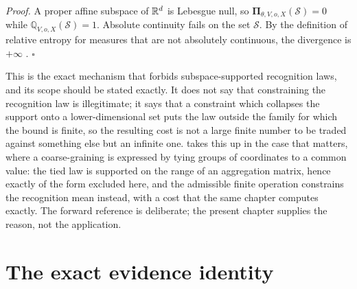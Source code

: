 \emph{Proof.} A proper affine subspace of \(\mathbb R^{d}\) is Lebesgue null, so \(\boldsymbol\Pi_{\theta,V,o,X}(\mathcal S)=0\) while \(\mathbb Q_{V,o,X}(\mathcal S)=1\). Absolute continuity fails on the set \(\mathcal S\). By the definition of relative entropy for measures that are not absolutely continuous, the divergence is \(+\infty\) \citep{Kullback1951,Csiszar1967}. \hfill\(\square\)

This is the exact mechanism that forbids subspace-supported recognition laws, and its scope should be stated exactly. It does not say that constraining the recognition law is illegitimate; it says that a constraint which collapses the support onto a lower-dimensional set puts the law outside the family for which the bound is finite, so the resulting cost is not a large finite number to be traded against something else but an infinite one.  takes this up in the case that matters, where a coarse-graining is expressed by tying groups of coordinates to a common value: the tied law is supported on the range of an aggregation matrix, hence exactly of the form excluded here, and the admissible finite operation constrains the recognition mean instead, with a cost that the same chapter computes exactly. The forward reference is deliberate; the present chapter supplies the reason, not the application.

\section{The exact evidence identity}
\label{sec:elbo-identity}

